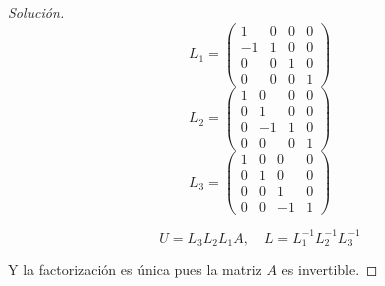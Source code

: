 \documentclass[12pt]{book}
\newenvironment{solucion}
  {\renewcommand\qedsymbol{$\square$}\begin{proof}[Solución]}
  {\end{proof}}
\begin{document}
\begin{solucion}
\[L_1=\begin{pmatrix}
1 & 0 & 0 & 0\\
-1 & 1 & 0 & 0\\
0 & 0 & 1 & 0\\
0 & 0 & 0 & 1
\end{pmatrix}\]
\[L_2=\begin{pmatrix}
1 & 0 & 0 & 0\\
0 & 1 & 0 & 0\\
0 & -1 & 1 & 0\\
0 & 0 & 0 & 1
\end{pmatrix}\]
\[L_3=\begin{pmatrix}
1 & 0 & 0 & 0\\
0 & 1 & 0 & 0\\
0 & 0 & 1 & 0\\
0 & 0 & -1 & 1
\end{pmatrix}\]

\[U=L_3L_2L_1A,\quad L=L_1^{-1}L_2^{-1}L_3^{-1}\]

Y la factorización es única pues la matriz $A$ es invertible.
\end{solucion}
\end{document}
